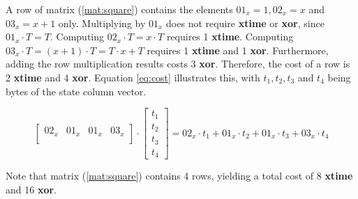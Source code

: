 A row of matrix (\ref{mat:square}) contains the elements $01_x = 1, 02_x = x$ and $03_x = x + 1$ only. Multiplying by $01_x$ does not require \textbf{xtime} or \textbf{xor}, since $01_x \cdot T = T$. Computing $02_x \cdot T = x \cdot T$ requires 1 \textbf{xtime}. Computing $03_x \cdot T = (x + 1) \cdot T = T \cdot x + T$ requires 1 \textbf{xtime} and 1 \textbf{xor}. Furthermore, adding the row multiplication results costs 3 \textbf{xor}. Therefore, the cost of a row is 2 \textbf{xtime} and 4 \textbf{xor}. Equation \ref{eq:cost} illustrates this, with $t_1, t_2, t_3$ and $t_4$ being bytes of the state column vector.

\begin{equation}\label{eq:cost}
\begin{bmatrix}
02_x & 01_x & 01_x & 03_x\\
\end{bmatrix}
\cdot
\begin{bmatrix}
t_1\\
t_2\\
t_3\\
t_4
\end{bmatrix}
= 02_x \cdot t_1 + 01_x \cdot t_2 + 01_x \cdot t_3 + 03_x \cdot t_4
\end{equation}

Note that matrix (\ref{mat:square}) contains 4 rows, yielding a total cost of 8 \textbf{xtime} and 16 \textbf{xor}.
